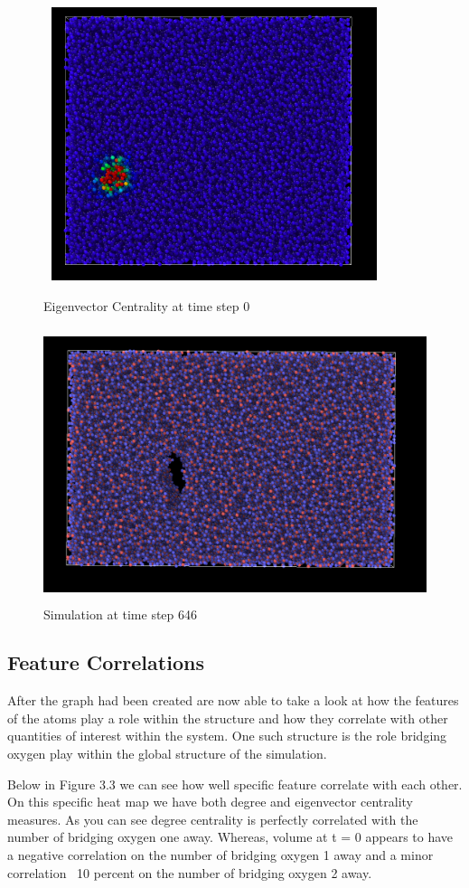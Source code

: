 \begin{figure}[H]
    \centering
    \noindent
\includegraphics[width=10cm , height = 8cm]{images/left.PNG}
    \caption{Eigenvector Centrality at time step 0}
    \label{fig:eig_cent}


    \centering
    \noindent
\includegraphics[width=12cm , height = 8cm]{images/right.PNG}
    \caption{Simulation at time step 646}
    \label{fig:right}
\end{figure}

\subsection{Feature Correlations}
After the graph had been created are now able to take a look at how the features of the atoms play a role within the structure and how they correlate with other quantities of interest within the system. One such structure is the role bridging oxygen play within the global structure of the simulation. 

Below in Figure 3.3 we can see how well specific feature correlate with each other. On this specific heat map we have both degree and eigenvector centrality measures. As you can see degree centrality is perfectly correlated with the number of bridging oxygen one away. Whereas, volume at t = 0 appears to have a negative correlation on the number of bridging oxygen 1 away and a minor correlation ~10 percent on the number of bridging oxygen 2 away. 

